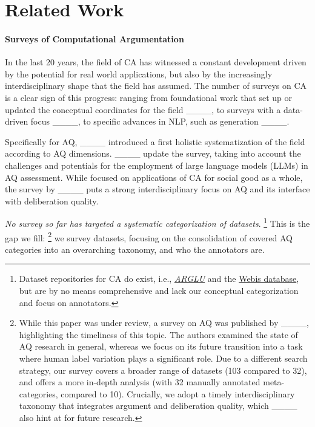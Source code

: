 \section{Related Work}
\label{sec:relatedwork}

\paragraph{Surveys of Computational Argumentation}

In the last 20 years, the field of CA has witnessed a constant development driven by the potential for real world applications, but also by the increasingly interdisciplinary shape that the field has assumed. The number of  surveys on CA is a clear sign of this progress: ranging from foundational work that set up or updated the conceptual coordinates for the field ____, to surveys with a data-driven focus ____, to specific advances in NLP, such as generation ____. 

Specifically for AQ, ____ introduced a first holistic systematization of the field according to AQ dimensions. ____ update the survey, taking into account the challenges and potentials for the employment of large language models (LLMs) in AQ assessment. While focused on applications of CA for social good as a whole, the survey by ____ puts a strong interdisciplinary focus on AQ and its interface with deliberation quality.

\textit{No survey so far has targeted a systematic categorization of datasets}.%
\footnote{Dataset repositories for CA do exist, i.e., \href{https://github.com/acidrobin/arglu-repo}{\textit{ARGLU}} and the \href{https://webis.de/data.html\#other-corpora}{Webis database}, but are by no means comprehensive and lack our conceptual categorization and focus on annotators.}
This is the gap we fill:%
\footnote{While this paper was under review, a survey on AQ was published by ____, highlighting the timeliness of this topic. The authors examined the state of AQ research in general, whereas we focus on its future transition into a task where human label variation plays a significant role. Due to a different search strategy, our survey covers a broader range of datasets (103 compared to 32), and offers a more in-depth analysis (with 32 manually annotated meta-categories, compared to 10). Crucially, we adopt a timely interdisciplinary taxonomy that integrates argument and deliberation quality, which ____ also hint at for future research.} 
we survey {datasets}, focusing on the {consolidation of covered AQ categories into an overarching taxonomy}, and who the {annotators} are.


